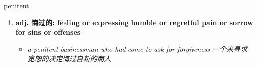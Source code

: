 
\begin{frame}
{\huge penitent}
\begin{center}
\begin{enumerate}\Large
  \item \textbf{adj. 悔过的: feeling or expressing humble or regretful pain or sorrow for sins or offenses}
  \begin{itemize}
    \item \em{\Large{a penitent businessman who had come to ask for forgiveness 一个来寻求宽恕的决定悔过自新的商人}}
  \end{itemize}
\end{enumerate}
\end{center}
\end{frame}

